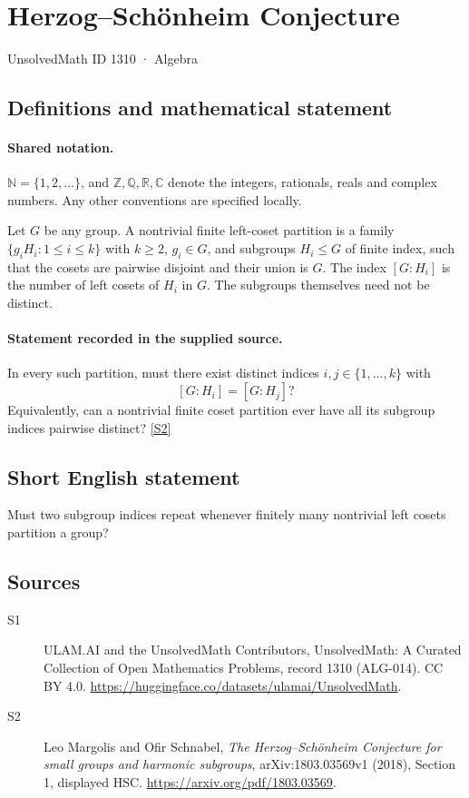 \documentclass[11pt]{article}
\newcommand{\sref}[2]{\hyperlink{source:#1:#2}{[S#2]}}
\begin{document}
\setcounter{section}{1309}
\section{Herzog–Schönheim Conjecture}\label{1310}
{\small\sffamily UnsolvedMath ID 1310 · Algebra}
\subsection{Definitions and mathematical statement}

\paragraph{Shared notation.}$\mathbb N=\{1,2,\ldots\}$, and $\mathbb Z,\mathbb Q,\mathbb R,\mathbb C$ denote the integers, rationals, reals and complex numbers. Any other conventions are specified locally.


Let $G$ be any group. A nontrivial finite left-coset partition is a family $\{g_iH_i:1\leq i\leq k\}$ with $k\geq2$, $g_i\in G$, and subgroups $H_i\leq G$ of finite index, such that the cosets are pairwise disjoint and their union is $G$. The index $[G:H_i]$ is the number of left cosets of $H_i$ in $G$. The subgroups themselves need not be distinct.
\paragraph{Statement recorded in the supplied source.}
In every such partition, must there exist distinct indices $i,j\in\{1,\ldots,k\}$ with
\[
[G:H_i]=[G:H_j]?
\]
Equivalently, can a nontrivial finite coset partition ever have all its subgroup indices pairwise distinct? \sref{1310}{2}

\subsection{Short English statement}
Must two subgroup indices repeat whenever finitely many nontrivial left cosets partition a group?
\subsection{Sources}
\begin{description}
\item[\hypertarget{source:1310:1}{S1}] ULAM.AI and the UnsolvedMath Contributors, UnsolvedMath: A Curated Collection of Open Mathematics Problems, record 1310 (ALG-014). CC BY 4.0. \url{https://huggingface.co/datasets/ulamai/UnsolvedMath}.
\item[\hypertarget{source:1310:2}{S2}] Leo Margolis and Ofir Schnabel, \emph{The Herzog--Sch\"onheim Conjecture for small groups and harmonic subgroups}, arXiv:1803.03569v1 (2018), Section 1, displayed HSC. \url{https://arxiv.org/pdf/1803.03569}.
\end{description}
\label{end:1310}
\end{document}

